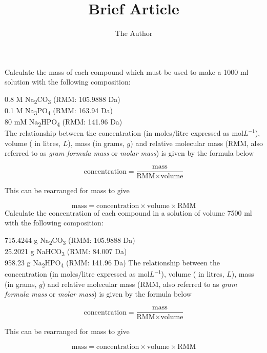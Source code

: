 \documentclass[11pt]{article} %
\title{Brief Article}
\author{The Author}
\begin{document}
Calculate the mass of each compound which must be used to make a 1000 ml     solution with the following composition:


0.8 M Na\textsubscript{2}CO\textsubscript{3} (RMM: 105.9888 Da)\\
0.1 M Na\textsubscript{3}PO\textsubscript{4} (RMM: 163.94 Da)\\
80 mM Na\textsubscript{2}HPO\textsubscript{4} (RMM: 141.96 Da)\\

\newpage 
The relationship between the concentration (in moles/litre expressed 
    as $ \textrm{mol}L^{-1} $), volume ( in litres, $L$), mass (in grams, $g$) and 
    relative molecular mass (RMM, also referred to as \emph{gram formula mass} 
    or \emph{molar mass}) is given by the formula below
    
    $$ \textrm{concentration} = \frac{\textrm{mass}}{\textrm{RMM}\times \textrm{volume}} $$
    
    This can be rearranged for mass to give
    
    $$ \textrm{mass} =  \textrm{concentration} \times \textrm{volume} \times \textrm{RMM} $$
  \newpage
Calculate the concentration of each compound in a 
    solution of volume 7500 ml with the following composition:
    
    715.4244 g Na\textsubscript{2}CO\textsubscript{3} (RMM: 105.9888 Da)\\
25.2021 g NaHCO\textsubscript{3} (RMM: 84.007 Da)\\
958.23 g Na\textsubscript{2}HPO\textsubscript{4} (RMM: 141.96 Da)
\newpage
The relationship between the concentration (in moles/litre expressed 
    as $ \textrm{mol}L^{-1} $), volume ( in litres, $L$), mass (in grams, $g$) and 
    relative molecular mass (RMM, also referred to as \emph{gram formula mass} 
    or \emph{molar mass}) is given by the formula below
    
    $$ \textrm{concentration} = \frac{\textrm{mass}}{\textrm{RMM}\times \textrm{volume}} $$
    
    This can be rearranged for mass to give
    
    $$ \textrm{mass} =  \textrm{concentration} \times \textrm{volume} \times \textrm{RMM} $$
\end{document}
